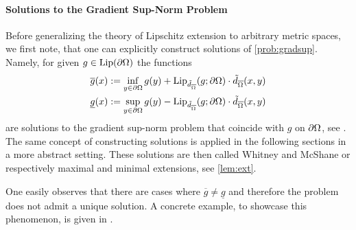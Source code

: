 \paragraph{Solutions to the Gradient Sup-Norm Problem} Before generalizing the theory of Lipschitz extension to arbitrary metric spaces, we first note, that one can explicitly construct solutions of \cref{prob:gradsup}. Namely, for given $g\in\operatorname{Lip}(\partial\Omega)$ the functions 
%
\begin{align}\label{eq:JenSol}
\begin{aligned}
\overline{g}(x) &:= \inf_{y\in\partial\domain} g(y) + 
\Lip_{\tilde{d}_{\overline{\domain}}}(g; \partial\domain)\cdot \tilde{d}_{\overline{\domain}}(x,y)\\
%
\underline{g}(x) &:= \sup_{y\in\partial\domain} g(y) - 
\Lip_{\tilde{d}_{\overline{\domain}}}(g; \partial\domain)\cdot \tilde{d}_{\overline{\domain}}(x,y)
\end{aligned}
\end{align}
%
are solutions to the gradient sup-norm problem that coincide with $g$ on $\partial\Omega$, see \cite[Th. 1.8]{jensen1993uniqueness}. The same concept of constructing solutions is applied in the following sections in a more abstract setting. 
These solutions are then called Whitney and McShane or respectively maximal and minimal extensions, see 
\cref{lem:ext}.

One easily observes that there are cases where $\overline{g}\neq \underline{g}$ and therefore the problem does not admit a unique solution. A concrete example, to showcase this phenomenon, is given in \cite[p. 53]{jensen1993uniqueness}.
%
%
